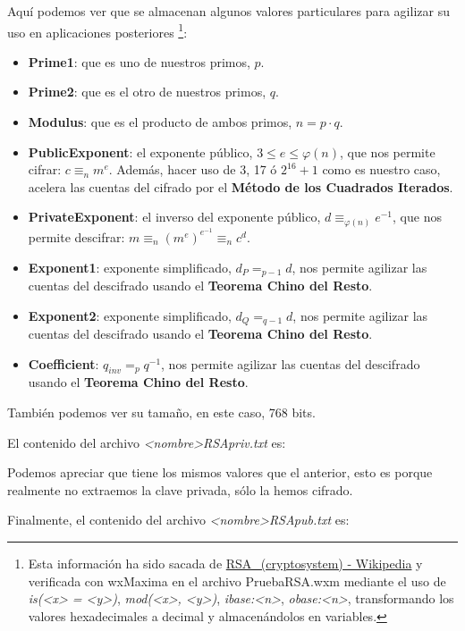 \documentclass[a4paper, 11pt]{article}
\begin{document}
		Aquí podemos ver que se almacenan algunos valores particulares para agilizar su uso en aplicaciones posteriores
		\footnote{Esta información ha sido sacada de \href{https://en.wikipedia.org/wiki/RSA\_(cryptosystem)\#Using\_the\_Chinese\_remainder\_algorithm}
		{RSA\_(cryptosystem) - Wikipedia} y verificada con wxMaxima en el archivo PruebaRSA.wxm mediante el uso de
		\textit{is(<x> = <y>)}, \textit{mod(<x>, <y>)}, \textit{ibase:<n>}, \textit{obase:<n>}, transformando los valores
		hexadecimales a decimal y almacenándolos en variables.}:
		\begin{itemize}
			\item \textbf{Prime1}: que es uno de nuestros primos, $p$.
			\item \textbf{Prime2}: que es el otro de nuestros primos, $q$.
			\item \textbf{Modulus}: que es el producto de ambos primos, $n = p \cdot q$.
			\item \textbf{PublicExponent}: el exponente público, $3 \le e \le \varphi(n)$, que nos permite cifrar: $c \equiv_n m^e$.
			Además, hacer uso de 3, 17 ó $2^{16}+1$ como es nuestro caso, acelera las cuentas del cifrado por el \textbf{Método
			de los Cuadrados Iterados}.
			\item \textbf{PrivateExponent}: el inverso del exponente público, $d \equiv_{\varphi(n)} e^{-1}$, que nos
			permite descifrar: $m \equiv_n (m^e)^{e^{-1}}\equiv_n c^d$.
			\item \textbf{Exponent1}: exponente simplificado, $d_P =_{p-1} d$, nos permite agilizar las cuentas del descifrado
			usando el \textbf{Teorema Chino del Resto}.
			\item \textbf{Exponent2}: exponente simplificado, $d_Q =_{q-1} d$, nos permite agilizar las cuentas del descifrado
			usando el \textbf{Teorema Chino del Resto}.
			\item \textbf{Coefficient}: $q_{inv} =_{p} q^{-1}$, nos permite agilizar las cuentas del descifrado usando el
			\textbf{Teorema Chino del Resto}.
		\end{itemize}
		
		También podemos ver su tamaño, en este caso, 768 bits.
		
		El contenido del archivo \textit{<nombre>RSApriv.txt} es:
		
		
		Podemos apreciar que tiene los mismos valores que el anterior, esto es porque realmente no extraemos la clave privada,
		sólo la hemos cifrado.
		
		Finalmente, el contenido del archivo \textit{<nombre>RSApub.txt} es:
		
		
\end{document}
